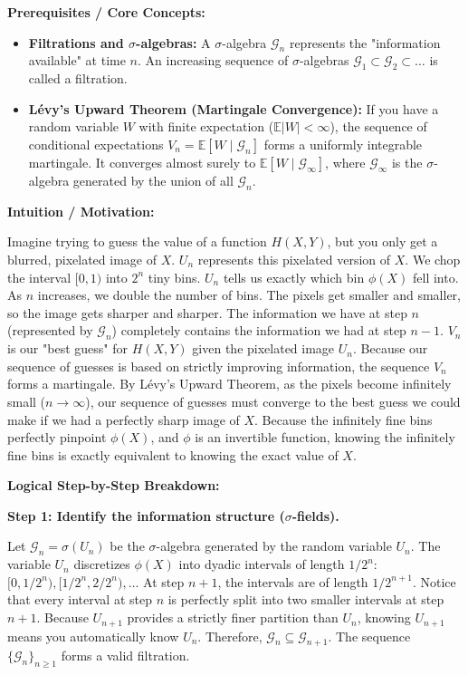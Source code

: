 \begin{solution}
\textbf{Prerequisites / Core Concepts:}
\begin{itemize}
    \item \textbf{Filtrations and $\sigma$-algebras:} A $\sigma$-algebra $\mathcal{G}_n$ represents the "information available" at time $n$. An increasing sequence of $\sigma$-algebras $\mathcal{G}_1 \subset \mathcal{G}_2 \subset \dots$ is called a filtration.
    \item \textbf{Lévy's Upward Theorem (Martingale Convergence):} If you have a random variable $W$ with finite expectation ($\mathbb{E}|W| < \infty$), the sequence of conditional expectations $V_n = \mathbb{E}[W \mid \mathcal{G}_n]$ forms a uniformly integrable martingale. It converges almost surely to $\mathbb{E}[W \mid \mathcal{G}_\infty]$, where $\mathcal{G}_\infty$ is the $\sigma$-algebra generated by the union of all $\mathcal{G}_n$.
\end{itemize}

\textbf{Intuition / Motivation:}

Imagine trying to guess the value of a function $H(X,Y)$, but you only get a blurred, pixelated image of $X$.
$U_n$ represents this pixelated version of $X$. We chop the interval $[0,1)$ into $2^n$ tiny bins. $U_n$ tells us exactly which bin $\phi(X)$ fell into.
As $n$ increases, we double the number of bins. The pixels get smaller and smaller, so the image gets sharper and sharper. The information we have at step $n$ (represented by $\mathcal{G}_n$) completely contains the information we had at step $n-1$.
$V_n$ is our "best guess" for $H(X,Y)$ given the pixelated image $U_n$. Because our sequence of guesses is based on strictly improving information, the sequence $V_n$ forms a martingale.
By Lévy's Upward Theorem, as the pixels become infinitely small ($n \to \infty$), our sequence of guesses must converge to the best guess we could make if we had a perfectly sharp image of $X$. Because the infinitely fine bins perfectly pinpoint $\phi(X)$, and $\phi$ is an invertible function, knowing the infinitely fine bins is exactly equivalent to knowing the exact value of $X$.

\textbf{Logical Step-by-Step Breakdown:}

\textbf{Step 1: Identify the information structure ($\sigma$-fields).}

Let $\mathcal{G}_n = \sigma(U_n)$ be the $\sigma$-algebra generated by the random variable $U_n$.
The variable $U_n$ discretizes $\phi(X)$ into dyadic intervals of length $1/2^n$: $[0, 1/2^n), [1/2^n, 2/2^n), \dots$
At step $n+1$, the intervals are of length $1/2^{n+1}$. Notice that every interval at step $n$ is perfectly split into two smaller intervals at step $n+1$.
Because $U_{n+1}$ provides a strictly finer partition than $U_n$, knowing $U_{n+1}$ means you automatically know $U_n$.
Therefore, $\mathcal{G}_n \subseteq \mathcal{G}_{n+1}$. The sequence $\{\mathcal{G}_n\}_{n \geq 1}$ forms a valid filtration.


\end{solution}
